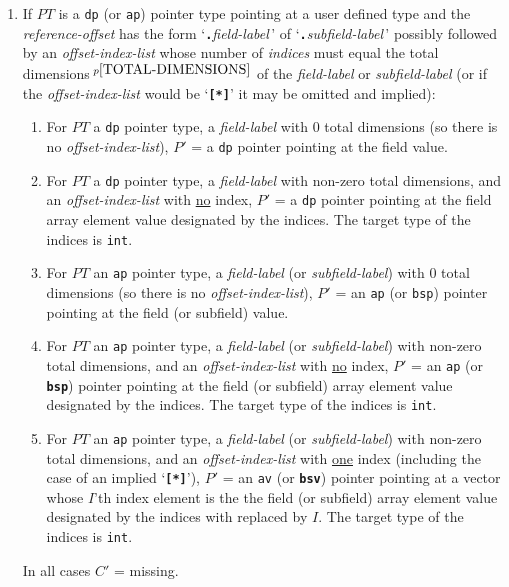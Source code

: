 \documentclass[12pt]{article}
\newcommand{\TT}[1]{{\tt \bfseries #1}}
\newcommand{\pagnote}[1]{$\,^{p\pageref{#1}}$}
\begin{document}
\begin{enumerate}[resume]
\begin{enumerate}
Then go back to step \ref{RUN-TIME-REFERENCE-COMPOUND-CASE}
(this current case does not consume a
{\em reference-offset}, but changes $PT$).
\end{enumerate}

\item\label{DP-AP-CASE}
If $PT$ is a {\tt dp} (or {\tt ap}) pointer type pointing
at a user defined type and the
{\em reference-offset} has the form `\TT{.}{\em field-label}\,'
of `\TT{.}{\em subfield-label}\,'
possibly followed by an {\em offset-index-list} whose number of
{\em indices} must equal the total dimensions\pagnote{TOTAL-DIMENSIONS}
of the {\em field-label} or {\em subfield-label} (or if
the {\em offset-index-list} would be `\TT{[*]}' it may be omitted and
implied):
\begin{enumerate}
\item For $PT$ a {\tt dp} pointer type, a {\em field-label}
with 0 total dimensions (so there is no {\em offset-index-list}),
$P'$ = a {\tt dp} pointer pointing at the field value.
\item For $PT$ a {\tt dp} pointer type, a {\em field-label}
with non-zero total dimensions,
and an {\em offset-index-list} with \underline{no} \TT{*} index,
$P'$ = a {\tt dp} pointer pointing
at the field array element value designated by the indices.
The target type of the indices is {\tt int}.
\item For $PT$ an {\tt ap} pointer type, a {\em field-label}
(or {\em subfield-label})
with 0 total dimensions (so there is no {\em offset-index-list}),
$P'$ = an {\tt ap} (or {\tt bsp}) pointer pointing at the field
(or subfield) value.
\item For $PT$ an {\tt ap} pointer type, a {\em field-label}
(or {\em subfield-label})
with non-zero total dimensions,
and an {\em offset-index-list} with \underline{no} \TT{*} index,
$P'$ = an {\tt ap} (or \TT{bsp}) pointer pointing
at the field (or subfield) array element value designated by the indices.
The target type of the indices is {\tt int}.
\item For $PT$ an {\tt ap} pointer type, a {\em field-label}
(or {\em subfield-label})
with non-zero total dimensions,
and an {\em offset-index-list} with \underline{one} \TT{*} index
(including the case of an implied `\TT{[*]}'),
$P'$ = an {\tt av} (or \TT{bsv}) pointer pointing at a vector
whose $I$'th index element is the
the field (or subfield) array element value designated by the indices with
\TT{*} replaced by $I$.
The target type of the indices is {\tt int}.
\end{enumerate}
In all cases $C'$ = missing.


\end{enumerate}
\end{document}
